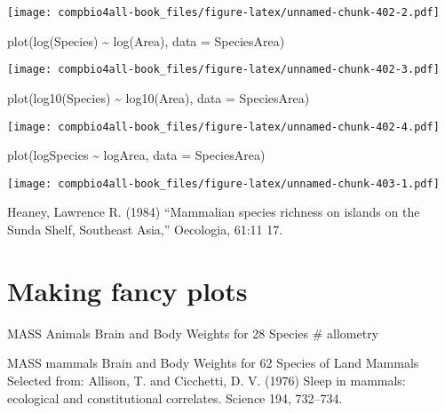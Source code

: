 \documentclass[
]{book}
\newenvironment{Shaded}{\begin{snugshade}}{\end{snugshade}}
\newcommand{\AttributeTok}[1]{\textcolor[rgb]{0.77,0.63,0.00}{#1}}
\newcommand{\FunctionTok}[1]{\textcolor[rgb]{0.00,0.00,0.00}{#1}}
\newcommand{\NormalTok}[1]{#1}
\newcommand{\SpecialCharTok}[1]{\textcolor[rgb]{0.00,0.00,0.00}{#1}}
\begin{document}
\texttt{[image: compbio4all-book\_files/figure-latex/unnamed-chunk-402-2.pdf]}

\begin{Shaded}
\begin{Highlighting}[]
\FunctionTok{plot}\NormalTok{(}\FunctionTok{log}\NormalTok{(Species) }\SpecialCharTok{\textasciitilde{}} \FunctionTok{log}\NormalTok{(Area), }\AttributeTok{data =}\NormalTok{ SpeciesArea)}
\end{Highlighting}
\end{Shaded}

\texttt{[image: compbio4all-book\_files/figure-latex/unnamed-chunk-402-3.pdf]}

\begin{Shaded}
\begin{Highlighting}[]
\FunctionTok{plot}\NormalTok{(}\FunctionTok{log10}\NormalTok{(Species) }\SpecialCharTok{\textasciitilde{}} \FunctionTok{log10}\NormalTok{(Area), }\AttributeTok{data =}\NormalTok{ SpeciesArea)}
\end{Highlighting}
\end{Shaded}

\texttt{[image: compbio4all-book\_files/figure-latex/unnamed-chunk-402-4.pdf]}

\begin{Shaded}
\begin{Highlighting}[]
\FunctionTok{plot}\NormalTok{(logSpecies }\SpecialCharTok{\textasciitilde{}}\NormalTok{ logArea, }\AttributeTok{data =}\NormalTok{ SpeciesArea)}
\end{Highlighting}
\end{Shaded}

\texttt{[image: compbio4all-book\_files/figure-latex/unnamed-chunk-403-1.pdf]}

Heaney, Lawrence R. (1984) ``Mammalian species richness on islands on the Sunda Shelf, Southeast Asia,'' Oecologia, 61:11 17.

\hypertarget{making-fancy-plots}{%
\chapter{Making fancy plots}\label{making-fancy-plots}}

MASS Animals Brain and Body Weights for 28 Species \# allometry

MASS mammals Brain and Body Weights for 62 Species of Land Mammals
Selected from: Allison, T. and Cicchetti, D. V. (1976) Sleep in mammals: ecological and constitutional correlates. Science 194, 732--734.
\end{document}
